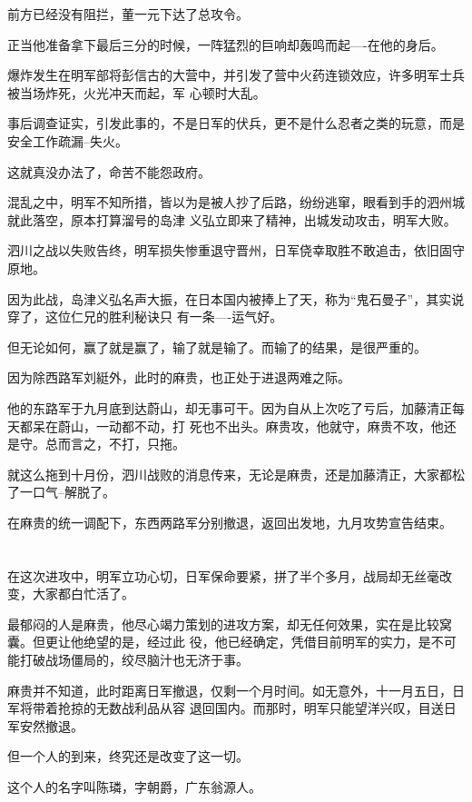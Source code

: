 \documentclass[11pt,a4paper,onecolumn]{article}
\begin{document}
前方已经没有阻拦，董一元下达了总攻令。

正当他准备拿下最后三分的时候，一阵猛烈的巨响却轰鸣而起----在他的身后。

爆炸发生在明军部将彭信古的大营中，并引发了营中火药连锁效应，许多明军士兵被当场炸死，火光冲天而起，军
心顿时大乱。

事后调查证实，引发此事的，不是日军的伏兵，更不是什么忍者之类的玩意，而是安全工作疏漏--失火。

这就真没办法了，命苦不能怨政府。

混乱之中，明军不知所措，皆以为是被人抄了后路，纷纷逃窜，眼看到手的泗州城就此落空，原本打算溜号的岛津
义弘立即来了精神，出城发动攻击，明军大败。

泗川之战以失败告终，明军损失惨重退守晋州，日军侥幸取胜不敢追击，依旧固守原地。

因为此战，岛津义弘名声大振，在日本国内被捧上了天，称为``鬼石曼子''，其实说穿了，这位仁兄的胜利秘诀只
有一条----运气好。

但无论如何，赢了就是赢了，输了就是输了。而输了的结果，是很严重的。

因为除西路军刘綎外，此时的麻贵，也正处于进退两难之际。

他的东路军于九月底到达蔚山，却无事可干。因为自从上次吃了亏后，加藤清正每天都呆在蔚山，一动都不动，打
死也不出头。麻贵攻，他就守，麻贵不攻，他还是守。总而言之，不打，只拖。

就这么拖到十月份，泗川战败的消息传来，无论是麻贵，还是加藤清正，大家都松了一口气--解脱了。

在麻贵的统一调配下，东西两路军分别撤退，返回出发地，九月攻势宣告结束。

\section[\thesection]{}

在这次进攻中，明军立功心切，日军保命要紧，拼了半个多月，战局却无丝毫改变，大家都白忙活了。

最郁闷的人是麻贵，他尽心竭力策划的进攻方案，却无任何效果，实在是比较窝囊。但更让他绝望的是，经过此
役，他已经确定，凭借目前明军的实力，是不可能打破战场僵局的，绞尽脑汁也无济于事。

麻贵并不知道，此时距离日军撤退，仅剩一个月时间。如无意外，十一月五日，日军将带着抢掠的无数战利品从容
退回国内。而那时，明军只能望洋兴叹，目送日军安然撤退。

但一个人的到来，终究还是改变了这一切。

这个人的名字叫陈璘，字朝爵，广东翁源人。
\end{document}
